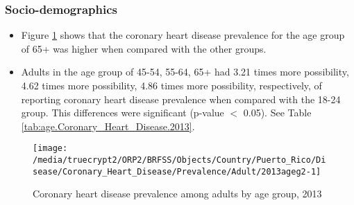 
\newpage
\subsubsection{Socio-demographics}

\begin{itemize}

\item Figure \ref{fig:age.Coronary_Heart_Disease.2013} shows that the coronary heart disease prevalence for the age group of
65+
was higher when compared with the other groups.

\item Adults in the age group of 45-54, 55-64, 65+ had 3.21 times more possibility, 4.62 times more possibility, 4.86 times more possibility, respectively, of reporting coronary heart disease prevalence when compared with the 18-24 group. This differences were significant (p-value $<$ 0.05). See Table \ref{tab:age.Coronary_Heart_Disease.2013}.


\end{itemize}


\begin{figure}[H]
\caption{Coronary heart disease prevalence among adults by age group, 
2013}
\begin{knitrout}
\color{fgcolor}

{\centering \texttt{[image: /media/truecrypt2/ORP2/BRFSS/Objects/Country/Puerto\_Rico/Disease/Coronary\_Heart\_Disease/Prevalence/Adult/2013ageg2-1]} 

}



\end{knitrout}
\label{fig:age.Coronary_Heart_Disease.2013}
\end{figure}

